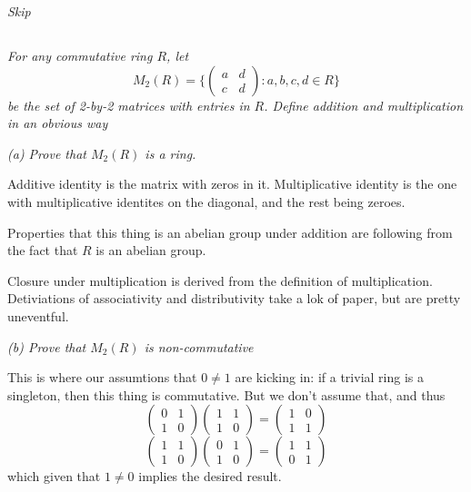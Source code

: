 \documentclass[11pt,oneside,titlepage]{book}
\newcommand{\set}[1]{\{ #1 \}}
\begin{document}
\textit{Skip}

\subsection{}

\textit{For any commutative ring $R$, let
  $$M_2(R) = \set{
    \begin{pmatrix}
      a & d \\ c & d
    \end{pmatrix}: a, b, c, d \in R
  }$$
  be the set of 2-by-2 matrices with entries in $R$. Define addition
  and multiplication in an obvious way }

\textit{(a) Prove that $M_2(R)$ is a ring.}

Additive identity is the matrix with zeros in it. Multiplicative
identity is the one with multiplicative identites on the diagonal, and
the rest being zeroes.

Properties that this thing is an abelian group
under addition are following from the fact that $R$ is an abelian
group.

Closure under multiplication is derived from the definition of
multiplication.  Detiviations of associativity and distributivity take
a lok of paper, but are pretty uneventful.

\textit{(b) Prove that $M_2(R)$ is non-commutative}

This is where our assumtions that $0 \neq 1$ are kicking in: if
a trivial ring is a singleton, then this thing is commutative.
But we don't assume that, and thus
$$
\begin{pmatrix}
  0 & 1 \\
  1 & 0
\end{pmatrix}
\begin{pmatrix}
  1 & 1 \\
  1 & 0
\end{pmatrix}
=
\begin{pmatrix}
  1 & 0 \\
  1 & 1
\end{pmatrix}
$$
$$
\begin{pmatrix}
  1 & 1 \\
  1 & 0
\end{pmatrix}
\begin{pmatrix}
  0 & 1 \\
  1 & 0
\end{pmatrix}
=
\begin{pmatrix}
  1 & 1 \\
  0 & 1
\end{pmatrix}
$$
which given that $1 \neq 0$ implies the desired result.
\end{document}
